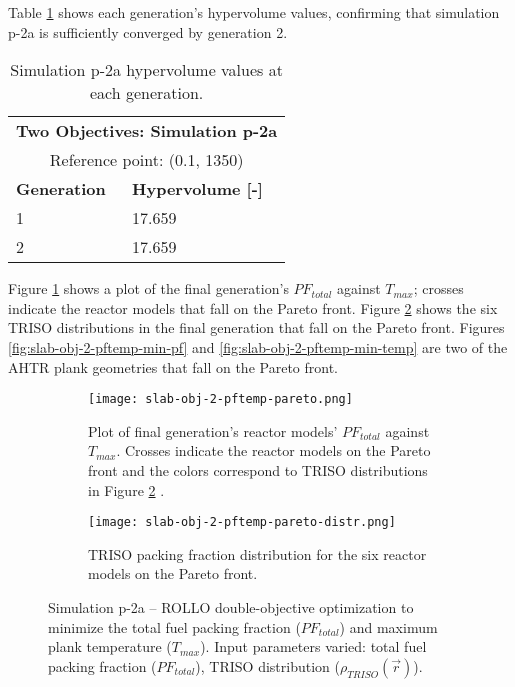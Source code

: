 Table \ref{tab:p2a-hypervolume} shows each generation's hypervolume values, 
confirming that simulation p-2a is sufficiently converged by generation 2. 
\begin{table}[htbp!]
    \centering
    \onehalfspacing
    \caption{Simulation p-2a hypervolume values at each generation.}
	\label{tab:p2a-hypervolume}
    \footnotesize
    \begin{tabular}{ll}
    \hline 
    \multicolumn{2}{c}{\textbf{Two Objectives: Simulation p-2a}} \\
    \multicolumn{2}{c}{Reference point: (0.1, 1350)} \\
    \hline 
    \textbf{Generation} & \textbf{Hypervolume [-]} \\
    \hline
    1 & 17.659 \\
    2 & 17.659 \\
    \hline
    \end{tabular}
\end{table}
Figure \ref{fig:slab-obj-2-pftemp-pareto} shows a plot of the final generation's 
$PF_{total}$ against $T_{max}$; crosses indicate the reactor models that 
fall on the Pareto front.
Figure \ref{fig:slab-obj-2-pftemp-pareto-distr} shows the six TRISO distributions in 
the final generation that fall on the Pareto front.
Figures \ref{fig:slab-obj-2-pftemp-min-pf} and \ref{fig:slab-obj-2-pftemp-min-temp} 
are two of the \gls{AHTR} plank geometries that fall on the Pareto front. 
\begin{figure}[htbp!]
    \centering
    \begin{subfigure}{\textwidth}
        \texttt{[image: slab-obj-2-pftemp-pareto.png]}
        \caption{Plot of final generation's reactor models' $PF_{total}$ against 
        $T_{max}$. Crosses indicate the reactor models on the Pareto front and the 
        colors correspond to TRISO distributions in Figure 
        \ref{fig:slab-obj-2-pftemp-pareto-distr} .}
        \label{fig:slab-obj-2-pftemp-pareto} 
    \end{subfigure}
    \begin{subfigure}{\textwidth}
        \texttt{[image: slab-obj-2-pftemp-pareto-distr.png]}
        \caption{TRISO packing fraction distribution for the six reactor models on the 
        Pareto front.}
        \label{fig:slab-obj-2-pftemp-pareto-distr} 
    \end{subfigure}
    \caption{Simulation p-2a -- ROLLO double-objective optimization to minimize the total 
    fuel packing fraction ($PF_{total}$) and maximum plank temperature ($T_{max}$). 
    Input parameters varied: total fuel packing fraction ($PF_{total}$), 
    \gls{TRISO} distribution ($\rho_{TRISO}(\vec{r})$).}
    \label{fig:slab-obj-2-pftemp}
\end{figure}
